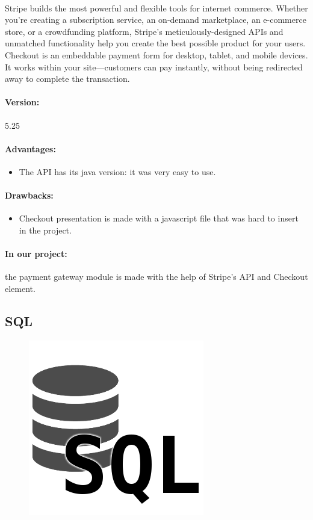 \documentclass{article}
\begin{document}
		\paragraph{}Stripe builds the most powerful and flexible tools for internet commerce. Whether you’re creating a subscription service, an on-demand marketplace, an e-commerce store, or a crowdfunding platform, Stripe’s meticulously-designed APIs and unmatched functionality help you create the best possible product for your users. Checkout is an embeddable payment form for desktop, tablet, and mobile devices. It works within your site—customers can pay instantly, without being redirected away to complete the transaction.
		\paragraph{Version:} 5.25
		\paragraph{Advantages:}
		\begin{itemize}
			\item{}The API has its java version: it was very easy to use.
		\end{itemize}
		\paragraph{Drawbacks:}
		\begin{itemize}
			\item{}Checkout presentation is made with a javascript file that was hard to insert in the project.
		\end{itemize}
		\paragraph{In our project:}the payment gateway module is made with the help of Stripe’s API and Checkout element.
	\subsection{SQL}
			\begin{figure}[H]
			\begin{center}
			\includegraphics[width=.2\linewidth]{Images/Appendix/sql.png}
			\label{fig:SQL}
			\end{center}
			\end{figure}		
\end{document}
